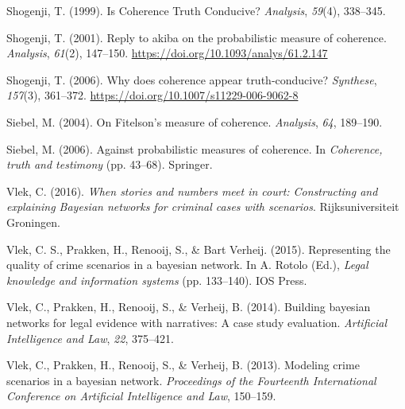 \documentclass[10pt,]{scrartcl}
\begin{document}
\hypertarget{ref-shogenji1999}{}
Shogenji, T. (1999). Is Coherence Truth Conducive? \emph{Analysis},
\emph{59}(4), 338--345.

\hypertarget{ref-Shogenji2001Reply}{}
Shogenji, T. (2001). Reply to akiba on the probabilistic measure of
coherence. \emph{Analysis}, \emph{61}(2), 147--150.
\url{https://doi.org/10.1093/analys/61.2.147}

\hypertarget{ref-Shogenji2006Why}{}
Shogenji, T. (2006). Why does coherence appear truth-conducive?
\emph{Synthese}, \emph{157}(3), 361--372.
\url{https://doi.org/10.1007/s11229-006-9062-8}

\hypertarget{ref-Siebel2004On-Fitelsons-me}{}
Siebel, M. (2004). On Fitelson's measure of coherence. \emph{Analysis},
\emph{64}, 189--190.

\hypertarget{ref-siebel2006against}{}
Siebel, M. (2006). Against probabilistic measures of coherence. In
\emph{Coherence, truth and testimony} (pp. 43--68). Springer.

\hypertarget{ref-vlek2016stories}{}
Vlek, C. (2016). \emph{When stories and numbers meet in court:
Constructing and explaining Bayesian networks for criminal cases with
scenarios}. Rijksuniversiteit Groningen.

\hypertarget{ref-vlek2015}{}
Vlek, C. S., Prakken, H., Renooij, S., \& Bart Verheij. (2015).
Representing the quality of crime scenarios in a bayesian network. In A.
Rotolo (Ed.), \emph{Legal knowledge and information systems} (pp.
133--140). IOS Press.

\hypertarget{ref-vlek2014building}{}
Vlek, C., Prakken, H., Renooij, S., \& Verheij, B. (2014). Building
bayesian networks for legal evidence with narratives: A case study
evaluation. \emph{Artificial Intelligence and Law}, \emph{22}, 375--421.

\hypertarget{ref-vlek2013modeling}{}
Vlek, C., Prakken, H., Renooij, S., \& Verheij, B. (2013). Modeling
crime scenarios in a bayesian network. \emph{Proceedings of the
Fourteenth International Conference on Artificial Intelligence and Law},
150--159.
\end{document}
